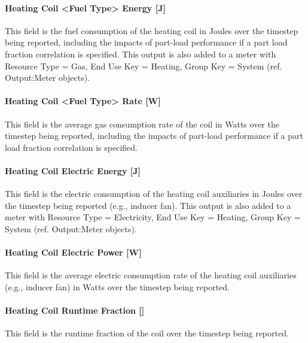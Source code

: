 \paragraph{Heating Coil <Fuel Type> Energy {[}J{]}}\label{heating-coil-gas-energy-j}

This field is the fuel consumption of the heating coil in Joules over the timestep being reported, including the impacts of part-load performance if a part load fraction correlation is specified. This output is also added to a meter with Resource Type = Gas, End Use Key = Heating, Group Key = System (ref. Output:Meter objects).

\paragraph{Heating Coil <Fuel Type> Rate {[}W{]}}\label{heating-coil-gas-rate-w}

This field is the average gas consumption rate of the coil in Watts over the timestep being reported, including the impacts of part-load performance if a part load fraction correlation is specified.

\paragraph{Heating Coil Electric Energy {[}J{]}}\label{heating-coil-electric-energy-j-2}

This field is the electric consumption of the heating coil auxiliaries in Joules over the timestep being reported (e.g., inducer fan). This output is also added to a meter with Resource Type = Electricity, End Use Key = Heating, Group Key = System (ref. Output:Meter objects).

\paragraph{Heating Coil Electric Power {[}W{]}}\label{heating-coil-electric-power-w-3}

This field is the average electric consumption rate of the heating coil auxiliaries (e.g., inducer fan) in Watts over the timestep being reported.

\paragraph{Heating Coil Runtime Fraction {[]}}\label{heating-coil-runtime-fraction-3}

This field is the runtime fraction of the coil over the timestep being reported.


